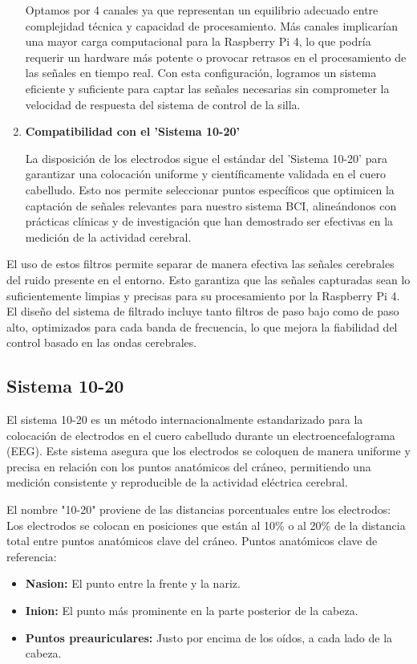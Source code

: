 \documentclass{article}
\begin{document}
\begin{enumerate}
    Optamos por 4 canales ya que representan un equilibrio adecuado entre complejidad técnica y capacidad de procesamiento. Más canales implicarían una mayor carga computacional para la Raspberry Pi 4, lo que podría requerir un hardware más potente o provocar retrasos en el procesamiento de las señales en tiempo real. Con esta configuración, logramos un sistema eficiente y suficiente para captar las señales necesarias sin comprometer la velocidad de respuesta del sistema de control de la silla.
    \item \textbf{Compatibilidad con el 'Sistema 10-20'} 
    
    La disposición de los electrodos sigue el estándar del 'Sistema 10-20' para garantizar una colocación uniforme y científicamente validada en el cuero cabelludo. Esto nos permite seleccionar puntos específicos que optimicen la captación de señales relevantes para nuestro sistema BCI, alineándonos con prácticas clínicas y de investigación que han demostrado ser efectivas en la medición de la actividad cerebral.
\end{enumerate}

El uso de estos filtros permite separar de manera efectiva las señales cerebrales del ruido presente en el entorno. Esto garantiza que las señales capturadas sean lo suficientemente limpias y precisas para su procesamiento por la Raspberry Pi 4. El diseño del sistema de filtrado incluye tanto filtros de paso bajo como de paso alto, optimizados para cada banda de frecuencia, lo que mejora la fiabilidad del control basado en las ondas cerebrales.

\subsection{Sistema 10-20}

El sistema 10-20 es un método internacionalmente estandarizado para la colocación de electrodos en el cuero cabelludo durante un electroencefalograma (EEG). Este sistema asegura que los electrodos se coloquen de manera uniforme y precisa en relación con los puntos anatómicos del cráneo, permitiendo una medición consistente y reproducible de la actividad eléctrica cerebral.

El nombre "10-20" proviene de las distancias porcentuales entre los electrodos: Los electrodos se colocan en posiciones que están al 10\% o al 20\% de la distancia total entre puntos anatómicos clave del cráneo.
Puntos anatómicos clave de referencia:
\begin{itemize}
    \item \textbf{Nasion:} El punto entre la frente y la nariz.
    \item \textbf{Inion:} El punto más prominente en la parte posterior de la cabeza.
    \item \textbf{Puntos preauriculares:} Justo por encima de los oídos, a cada lado de la cabeza.
\end{itemize}
\end{document}
